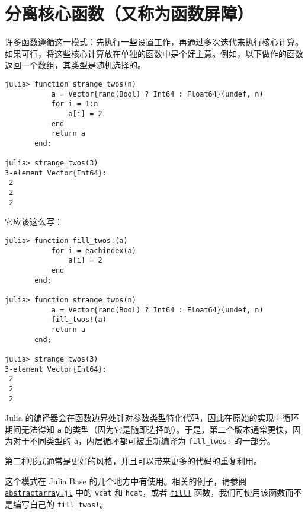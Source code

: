 \section{分离核心函数（又称为函数屏障）}



许多函数遵循这一模式：先执行一些设置工作，再通过多次迭代来执行核心计算。如果可行，将这些核心计算放在单独的函数中是个好主意。例如，以下做作的函数返回一个数组，其类型是随机选择的。




\begin{verbatim}
julia> function strange_twos(n)
           a = Vector{rand(Bool) ? Int64 : Float64}(undef, n)
           for i = 1:n
               a[i] = 2
           end
           return a
       end;

julia> strange_twos(3)
3-element Vector{Int64}:
 2
 2
 2
\end{verbatim}



它应该这么写：




\begin{verbatim}
julia> function fill_twos!(a)
           for i = eachindex(a)
               a[i] = 2
           end
       end;

julia> function strange_twos(n)
           a = Vector{rand(Bool) ? Int64 : Float64}(undef, n)
           fill_twos!(a)
           return a
       end;

julia> strange_twos(3)
3-element Vector{Int64}:
 2
 2
 2
\end{verbatim}



Julia 的编译器会在函数边界处针对参数类型特化代码，因此在原始的实现中循环期间无法得知 \texttt{a} 的类型（因为它是随即选择的）。于是，第二个版本通常更快，因为对于不同类型的 \texttt{a}，内层循环都可被重新编译为 \texttt{fill\_twos!} 的一部分。



第二种形式通常是更好的风格，并且可以带来更多的代码的重复利用。



这个模式在 Julia Base 的几个地方中有使用。相关的例子，请参阅 \href{https://github.com/JuliaLang/julia/blob/40fe264f4ffaa29b749bcf42239a89abdcbba846/base/abstractarray.jl\#L1205-L1206}{\texttt{abstractarray.jl}} 中的 \texttt{vcat} 和 \texttt{hcat}，或者 \hyperlink{5162290739791026948}{\texttt{fill!}} 函数，我们可使用该函数而不是编写自己的 \texttt{fill\_twos!}。



